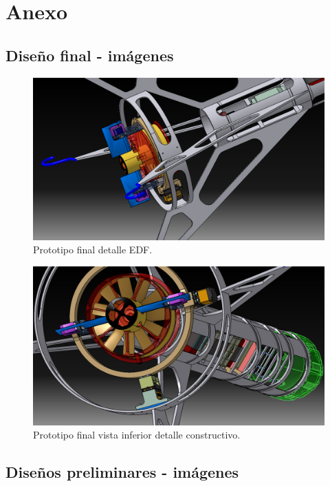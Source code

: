 \null\newpage
\clearpage

\section{Anexo}

\subsection{Diseño final - imágenes}
\begin{figure}[htb]
    \centering
    \includegraphics[width=\linewidth]{fig/design/v6_3}
    \caption{Prototipo final detalle EDF.}
    \label{fig:design/v6_3}
\end{figure}

\begin{figure}[htb]
    \centering
    \includegraphics[width=\linewidth]{fig/design/v6_5}
    \caption{Prototipo final vista inferior detalle constructivo.}
    \label{fig:design/v6_5}
\end{figure}

\subsection{Diseños preliminares - imágenes}

